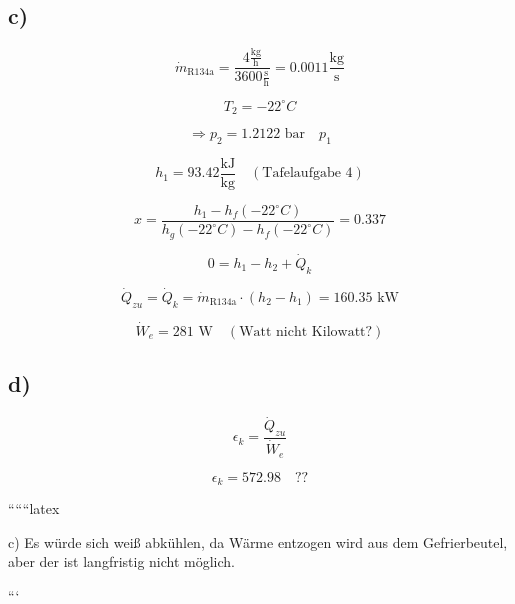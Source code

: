\subsection*{c)}

\[
\dot{m}_{\text{R134a}} = \frac{4 \frac{\text{kg}}{\text{h}}}{3600 \frac{\text{s}}{\text{h}}} = 0.0011 \frac{\text{kg}}{\text{s}}
\]

\[
T_2 = -22^\circ C
\]

\[
\Rightarrow p_2 = 1.2122 \text{ bar} \quad p_1
\]

\[
h_1 = 93.42 \frac{\text{kJ}}{\text{kg}} \quad (\text{Tafelaufgabe 4})
\]

\[
x = \frac{h_1 - h_f(-22^\circ C)}{h_g(-22^\circ C) - h_f(-22^\circ C)} = 0.337
\]

\[
0 = h_1 - h_2 + \dot{Q}_k
\]

\[
\dot{Q}_{zu} = \dot{Q}_k = \dot{m}_{\text{R134a}} \cdot (h_2 - h_1) = 160.35 \text{ kW}
\]

\[
\dot{W}_e = 281 \text{ W} \quad (\text{Watt nicht Kilowatt?})
\]

\subsection*{d)}

\[
\epsilon_k = \frac{\dot{Q}_{zu}}{\dot{W}_e}
\]

\[
\epsilon_k = 572.98 \quad ??
\]

``````latex


c) Es würde sich weiß abkühlen, da Wärme entzogen wird aus dem Gefrierbeutel, aber der ist langfristig nicht möglich.

```